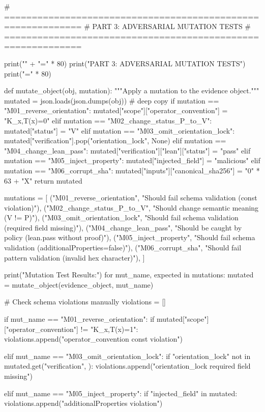 # ============================================================
# PART 3: ADVERSARIAL MUTATION TESTS
# ============================================================

print("\n" + "=" * 80)
print("PART 3: ADVERSARIAL MUTATION TESTS")
print("=" * 80)

def mutate_object(obj, mutation):
    """Apply a mutation to the evidence object."""
    mutated = json.loads(json.dumps(obj))  # deep copy
    if mutation == "M01_reverse_orientation":
        mutated["scope"]["operator_convention"] = "K_x,T(x)=0"
    elif mutation == "M02_change_status_P_to_V":
        mutated["status"] = "V"
    elif mutation == "M03_omit_orientation_lock":
        mutated["verification"].pop("orientation_lock", None)
    elif mutation == "M04_change_lean_pass":
        mutated["verification"]["lean"]["status"] = "pass"
    elif mutation == "M05_inject_property":
        mutated["injected_field"] = "malicious"
    elif mutation == "M06_corrupt_sha":
        mutated["inputs"]["canonical_sha256"] = "0" * 63 + "X"
    return mutated

mutations = [
    ("M01_reverse_orientation", "Should fail schema validation (const violation)"),
    ("M02_change_status_P_to_V", "Should change semantic meaning (V != P)"),
    ("M03_omit_orientation_lock", "Should fail schema validation (required field missing)"),
    ("M04_change_lean_pass", "Should be caught by policy (lean.pass without proof)"),
    ("M05_inject_property", "Should fail schema validation (additionalProperties=false)"),
    ("M06_corrupt_sha", "Should fail pattern validation (invalid hex character)"),
]

print("\n  Mutation Test Results:")
for mut_name, expected in mutations:
    mutated = mutate_object(evidence_object, mut_name)
    
    # Check schema violations manually
    violations = []
    
    if mut_name == "M01_reverse_orientation":
        if mutated["scope"]["operator_convention"] != "K_x,T(x)=1":
            violations.append("operator_convention const violation")
    
    elif mut_name == "M03_omit_orientation_lock":
        if "orientation_lock" not in mutated.get("verification", {}):
            violations.append("orientation_lock required field missing")
    
    elif mut_name == "M05_inject_property":
        if "injected_field" in mutated:
            violations.append("additionalProperties violation")
    
